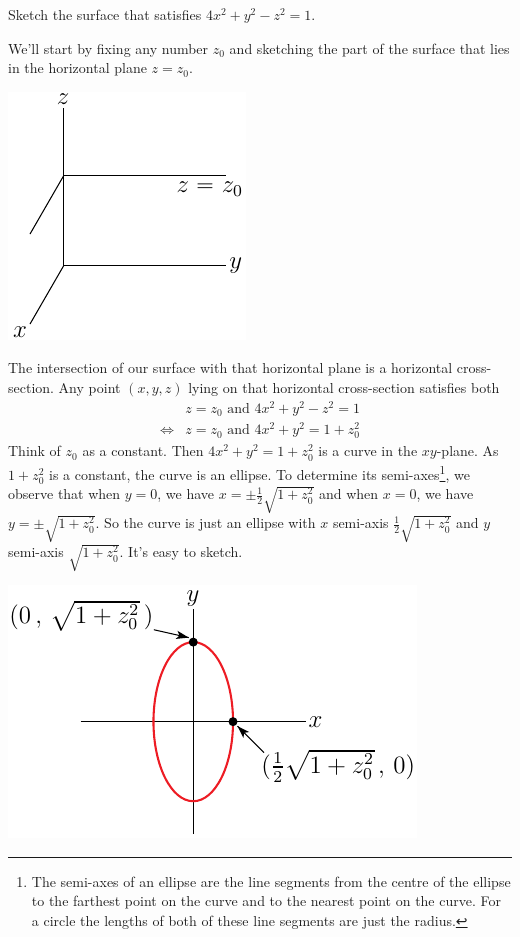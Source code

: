 \bigskip
\begin{eg}[$4x^2+y^2-z^2=1$]\label{eg hyperboloid}
\medskip
Sketch the surface that satisfies $4x^2+y^2-z^2=1$.

\soln We'll start by fixing any number $z_0$ and sketching the part of
the surface that lies in the horizontal plane $z=z_0$. 
\begin{efig}
\begin{center}
   \includegraphics{zedzeroPlane.pdf}
\end{center}
\end{efig}
The intersection of our surface with that horizontal plane is a horizontal
cross-section. Any point $(x,y,z)$ lying on that horizontal cross-section
satisfies both 
\begin{align*}
&z=z_0\text{\ \ and\ \ }4x^2+y^2-z^2=1 \\
\iff
&z=z_0\text{\  \ and\ \ }4x^2+y^2=1+z_0^2
\end{align*}
Think of $z_0$ as a constant.
Then $4x^2+y^2=1+z_0^2$ is a curve in the $xy$-plane. As $1+z_0^2$ is a constant, the curve is an ellipse. To determine its semi-axes\footnote{The
semi-axes of an ellipse are the line segments from the centre of the ellipse
to the farthest point on the curve and to the nearest point on the curve.
For a circle the lengths of both of these line segments are just the  radius.}, we observe that
when $y=0$, we have $x=\pm\frac{1}{2}\sqrt{1+z_0^2}$ and when $x=0$,
we have $y=\pm\sqrt{1+z_0^2}$. So the curve is just an ellipse with 
$x$ semi-axis $\frac{1}{2}\sqrt{1+z_0^2}$ and $y$ semi-axis 
$\sqrt{1+z_0^2}$. It's easy to sketch.
\begin{efig}
\begin{center}
   \includegraphics{ellipse.pdf}

\end{center}
\end{efig}
\end{eg}
